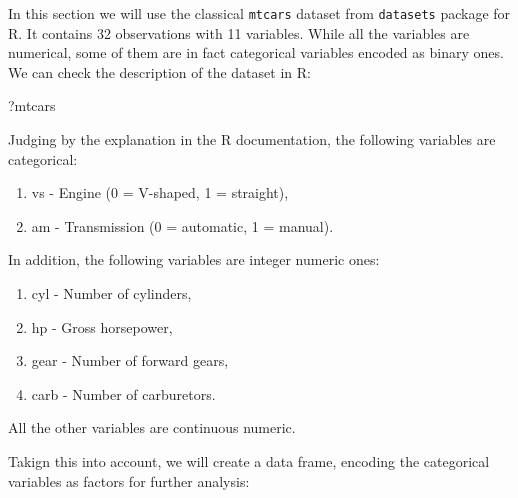 \documentclass[
]{book}
\newenvironment{Shaded}{\begin{snugshade}}{\end{snugshade}}
\newcommand{\AttributeTok}[1]{\textcolor[rgb]{0.77,0.63,0.00}{#1}}
\newcommand{\DecValTok}[1]{\textcolor[rgb]{0.00,0.00,0.81}{#1}}
\newcommand{\FunctionTok}[1]{\textcolor[rgb]{0.00,0.00,0.00}{#1}}
\newcommand{\NormalTok}[1]{#1}
\newcommand{\OtherTok}[1]{\textcolor[rgb]{0.56,0.35,0.01}{#1}}
\newcommand{\SpecialCharTok}[1]{\textcolor[rgb]{0.00,0.00,0.00}{#1}}
\newcommand{\StringTok}[1]{\textcolor[rgb]{0.31,0.60,0.02}{#1}}
\providecommand{\tightlist}{%
  \setlength{\itemsep}{0pt}\setlength{\parskip}{0pt}}
\theoremstyle{definition}
\theoremstyle{definition}
\theoremstyle{definition}
\theoremstyle{definition}
\theoremstyle{remark}
\begin{document}
In this section we will use the classical \texttt{mtcars} dataset from \texttt{datasets} package for R. It contains 32 observations with 11 variables. While all the variables are numerical, some of them are in fact categorical variables encoded as binary ones. We can check the description of the dataset in R:

\begin{Shaded}
\begin{Highlighting}[]
\NormalTok{?mtcars}
\end{Highlighting}
\end{Shaded}

Judging by the explanation in the R documentation, the following variables are categorical:

\begin{enumerate}
\def\labelenumi{\arabic{enumi}.}
\tightlist
\item
  vs - Engine (0 = V-shaped, 1 = straight),
\item
  am - Transmission (0 = automatic, 1 = manual).
\end{enumerate}

In addition, the following variables are integer numeric ones:

\begin{enumerate}
\def\labelenumi{\arabic{enumi}.}
\tightlist
\item
  cyl - Number of cylinders,
\item
  hp - Gross horsepower,
\item
  gear - Number of forward gears,
\item
  carb - Number of carburetors.
\end{enumerate}

All the other variables are continuous numeric.

Takign this into account, we will create a data frame, encoding the categorical variables as factors for further analysis:

\begin{Shaded}
\end{Shaded}
\end{document}
